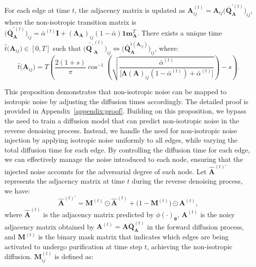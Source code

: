 \begin{proposition}
\label{equivalence}
    For each edge at time $t$, the adjacency matrix is updated as $\mathbf{A}^{(t)}_{ij} =\mathbf{A}_{ij}\big(\bar{\mathbf{Q}}^{\prime(t)}_{\mathbf{A}}\big)_{ij}$, where the non-isotropic transition matrix is  $\big(\bar{\mathbf{Q}}_{\mathbf{A}}^{\prime(t)}\big)_{ij} = \bar{\alpha}^{(t)} \mathbf{I} + (\boldsymbol{\Lambda}_{\mathbf{A}})_{ij}(1-\bar{\alpha})\mathbf{1} \mathbf{m}_{\mathbf{A}}^{T}$. There exists a unique time $\hat{t}\big(\mathbf{A}_{ij}\big)\in [0, T]$ such that $\big(\bar{\mathbf{Q}^\prime}_{\mathbf{A}}^{(t)}\big)_{ij}\Leftrightarrow \big(\bar{\mathbf{Q}}_{\mathbf{A}}^{\hat{t}(\mathbf{A}_{ij})}\big)_{ij}$, where:
    \begin{equation}
        \label{equation_purification_time}
        \hat{t}\big(\mathbf{A}_{ij}\big)\!=\! T\!\left(\frac{2(1\!+\!s)}{\pi} \cos^{-1}\! \left(\sqrt{\frac{\bar{\alpha}^{(t)}}{\big[\boldsymbol{\Lambda}(\mathbf{A})_{ij} (1-\bar{\alpha}^{(t)}) + \bar{\alpha}^{(t)}\big]}}\right)\!-\!s\right).
    \end{equation}
\end{proposition}
This proposition demonstrates that non-isotropic noise can be mapped to isotropic noise by adjusting the diffusion times accordingly. The detailed proof is provided in Appendix~\ref{appendix:proof}. Building on this proposition, we bypass the need to train a diffusion model that can predict non-isotropic noise in the reverse denoising process. 
Instead, we handle the need for non-isotropic noise injection by applying isotropic noise uniformly to all edges, while varying the total diffusion time for each edge. 
By controlling the diffusion time for each edge, we can effectively manage the noise introduced to each node, ensuring that the injected noise accounts for the adversarial degree of each node. 
Let $\hat{\mathbf{A}}^{(t)\prime}$ represents the adjacency matrix at time $t$ during the reverse denoising process, we have:
\begin{equation}
\label{equation_non_isotropic_purification}
\hat{\mathbf{A}}^{(t)\prime} = \mathbf{M}^{(t)} \odot \hat{\mathbf{A}}^{(t)} + \big(1-\mathbf{M}^{(t)}\big)\odot \mathbf{A}^{(t)},
\end{equation}
where $\hat{\mathbf{A}}^{(t)}$ is the adjacency matrix predicted by $\phi(\cdot)_{\boldsymbol{\theta}}$, $\mathbf{A}^{(t)}$ is the noisy adjacency matrix obtained by $\mathbf{A}^{(t)} = \mathbf{A}\bar{\mathbf{Q}}_{\mathbf{A}}^{(t)}$ in the forward diffusion process, and $\mathbf{M}^{(t)}$ is the binary mask matrix that indicates which edges are being activated to undergo purification at time step $t$, achieving the non-isotropic diffusion. $\mathbf{M}^{(t)}_{ij}$ is defined as:
